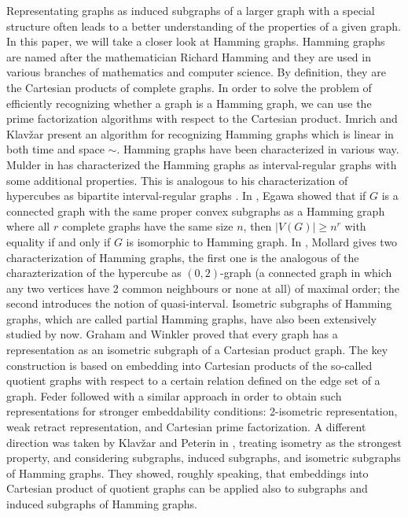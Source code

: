 \documentclass[12pt,a4paper,titlepage,openany]{report}
\begin{document}
Representating graphs as induced subgraphs of a larger graph with a special structure often leads to a better understanding of the properties of a given graph. In this paper, we will take a closer look at Hamming graphs. Hamming graphs are named after the mathematician Richard Hamming and they are used in various branches of mathematics and computer science. By definition, they are the Cartesian products of complete graphs. In order to solve the problem of efficiently recognizing whether a graph is a Hamming graph, we can use the prime factorization algorithms with respect to the Cartesian product. Imrich and Klav\v zar present an algorithm for recognizing Hamming graphs which is linear in both time and space $\sim$\cite{Imrich}.\newline
Hamming graphs have been characterized in various way. Mulder in \cite{Mulder} has characterized the Hamming graphs as interval-regular graphs with some additional properties. This is analogous to his characterization of hypercubes as bipartite interval-regular graphs \cite{Mulder}. In \cite{Egawa}, Egawa showed that if $G$ is a connected graph with the same proper convex subgraphs as a Hamming graph where all $r$ complete graphs have the same size $n$, then $|V(G)|\geq n^r$ with equality if and only if $G$ is isomorphic to Hamming graph. In \cite{Mollard}, Mollard gives two characterization of Hamming graphs, the first one is the analogous of the charazterization of the hypercube as $(0,2)$-graph (a connected graph in which any two vertices have 2 common neighbours or none at all) of maximal order; the second introduces the notion of quasi-interval. Isometric subgraphs of Hamming graphs, which are called partial Hamming graphs, have also been extensively studied by now. \newline
Graham and Winkler \cite{Winkler} proved that every graph has a representation as an isometric subgraph of a Cartesian product graph. The key construction is based on embedding into Cartesian products of the so-called quotient graphs with respect to a certain relation defined on the edge set of a graph. Feder \cite{Feder} followed with a similar approach in order to obtain such representations for stronger embeddability conditions: 2-isometric representation, weak retract representation, and Cartesian prime factorization. A different direction was taken by Klav\v zar and Peterin in \cite{Iztok}, treating isometry as the strongest property, and considering subgraphs, induced subgraphs, and isometric subgraphs of Hamming graphs. They showed, roughly speaking, that embeddings into Cartesian product of quotient graphs can be applied also to subgraphs and induced subgraphs of Hamming graphs. \newline
\end{document}
